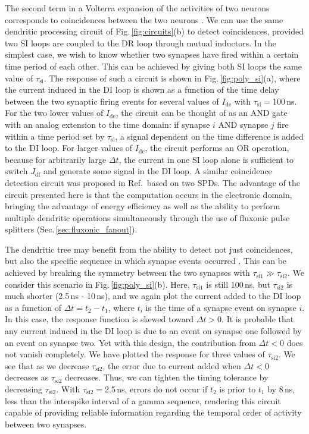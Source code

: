 \documentclass[twocolumn]{article}
\newcommand{\onlinecite}[1]{\hspace{-1 ex} \nocite{#1}\citenum{#1}}
\begin{document}
The second term in a Volterra expansion of the activities of two neurons corresponds to coincidences between the two neurons \cite{geki2002}. We can use the same dendritic processing circuit of Fig.\,\ref{fig:circuits}(b) to detect coincidences, provided two SI loops are coupled to the DR loop through mutual inductors. In the simplest case, we wish to know whether two synapses have fired within a certain time period of each other. This can be achieved by giving both SI loops the same value of $\tau_{\mathrm{si}}$. The response of such a circuit is shown in Fig.\,\ref{fig:poly_si}(a), where the current induced in the DI loop is shown as a function of the time delay between the two synaptic firing events for several values of $I_{\mathrm{de}}$ with $\tau_{\mathrm{si}} =$100\,ns. For the two lower values of $I_{\mathrm{de}}$, the circuit can be thought of as an AND gate with an analog extension to the time domain: if synapse $i$ AND synapse $j$ fire within a time period set by $\tau_{\mathrm{si}}$, a signal dependent on the time difference is added to the DI loop. For larger values of $I_{\mathrm{de}}$, the circuit performs an OR operation, because for arbitrarily large $\Delta t$, the current in one SI loop alone is sufficient to switch $J_{\mathrm{df}}$ and generate some signal in the DI loop. A similar coincidence detection circuit was proposed in Ref.\,\onlinecite{sh2018_full} based on two SPDs. The advantage of the circuit presented here is that the computation occurs in the electronic domain, bringing the advantage of energy efficiency as well as the ability to perform multiple dendritic operations simultaneously through the use of fluxonic pulse splitters (Sec.\,\ref{sec:fluxonic_fanout}).

The dendritic tree may benefit from the ability to detect not just coincidences, but also the specific sequence in which synapse events occurred \cite{haah2015}. This can be achieved by breaking the symmetry between the two synapses with $\tau_{\mathrm{si1}} \gg \tau_{\mathrm{si2}}$. We consider this scenario in Fig.\,\ref{fig:poly_si}(b). Here, $\tau_{\mathrm{si1}}$ is still 100\,ns, but $\tau_{\mathrm{si2}}$ is much shorter (2.5\,ns - 10\,ns), and we again plot the current added to the DI loop as a function of $\Delta t = t_2-t_1$, where $t_i$ is the time of a synapse event on synapse $i$. In this case, the response function is skewed toward $\Delta t > 0$. It is probable that any current induced in the DI loop is due to an event on synapse one followed by an event on synapse two. Yet with this design, the contribution from $\Delta t < 0$ does not vanish completely. We have plotted the response for three values of $\tau_{\mathrm{si2}}$. We see that as we decrease $\tau_{\mathrm{si2}}$, the error due to current added when $\Delta t < 0$ decreases as $\tau_{\mathrm{si2}}$ decreases. Thus, we can tighten the timing tolerance by decreasing $\tau_{\mathrm{si2}}$. With $\tau_{\mathrm{si2}} = $2.5\,ns, errors do not occur if $t_2$ is prior to $t_1$ by 8\,ns, less than the interspike interval of a gamma sequence, rendering this circuit capable of providing reliable information regarding the temporal order of activity between two synapses.
\end{document}
